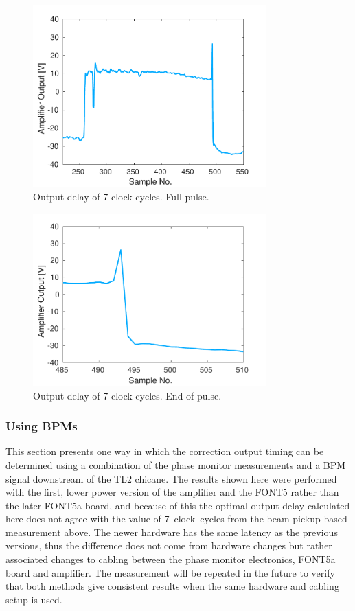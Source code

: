 \begin{figure}
  \centering
  \includegraphics[width=0.8\textwidth]{Figures/commissioning/absDelay7_all}
  \caption{Output delay of 7 clock cycles. Full pulse.}
  \label{f:absDelay7_all}
\end{figure}

\begin{figure}
  \centering
  \includegraphics[width=0.8\textwidth]{Figures/commissioning/absDelay7_end}
  \caption{Output delay of 7 clock cycles. End of pulse.}
  \label{f:absDelay7_end}
\end{figure}


\subsubsection{Using BPMs}
\label{sss:relativeBPM}

This section presents one way in which the correction output timing can be determined using a combination of the phase monitor measurements and a BPM signal downstream of the TL2 chicane. The results shown here were performed with the first, lower power version of the amplifier and the FONT5 rather than the later FONT5a board, and because of this the optimal output delay calculated here does not agree with the value of 7~clock~cycles from the beam pickup based measurement above. The newer hardware has the same latency as the previous versions, thus the difference does not come from hardware changes but rather associated changes to cabling between the phase monitor electronics, FONT5a board and amplifier. The measurement will be repeated in the future to verify that both methods give consistent results when the same hardware and cabling setup is used.

